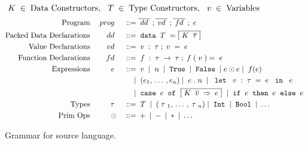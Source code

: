 \begin{figure}
    \begin{displaymath}
    \; {K} \; \in \; \textup{Data Constructors}, \:\: \; {T} \; \in \; \textup{Type Constructors}, \:\: \; v \; \in \; \textup{Variables}
  \end{displaymath} 
  \begin{displaymath}
    \begin{aligned}
      \textup{Program} && \PROG && \gramdef &
        \overline{\DD} \;; \overline{\VD} \; ; \overline{\FD} \; ; \EXPR 
        \\
      \textup{Packed Data Declarations} && \DD && \gramdef & \DATA \TC = \overline{[\DC \; \overline{\sTYP}\;]} \\
      \textup{Value Declarations}    && \VD && \gramdef & \var : \TYP  ; \var = \EXPR \\ 
      \textup{Function Declarations} && \FD && \gramdef &
         \fvar : \TYP \ARROW \TYP; 
         \fvar({\var}) = \EXPR \\ 
      \textup{Expressions} && \EXPR && \gramdef & \var \gramor \num \gramor \gramwd{True} \gramor \gramwd{False}
      \gramor \sEXPR \PRIM \sEXPR
      \gramor 
       \app{f}{\sEXPR} \\
%
      && && \gramor & 
      \;(e_1,\, \dots\, , e_n) \gramor \EXPR.\num 
      \gramor \letexpr{\var:\TYP}{\EXPR}{\EXPR} \\
      && && \gramor & \case{\sEXPR}{\overline{[\bind{\DC \; \overline{\svar} \;}{\EXPR}]}} 
            \gramor  \ife{\EXPR}{\EXPR}{\EXPR} \\
      \textup{Types} && \TYP && \gramdef &
         \TC \gramor
         \;(\TYP_1,\, \dots\, , \TYP_n)
         \gramor \gramwd{Int} \gramor \gramwd{Bool} \gramor \dots
      \\
      \textup{Prim Ops} && \PRIM && \gramdef & + \gramor - \gramor * \gramor \ldots \\
    \end{aligned}
  \end{displaymath}
   \vspace{-4mm}
  \caption{Grammar for source language.}
  \label{fig:source}
\end{figure}


